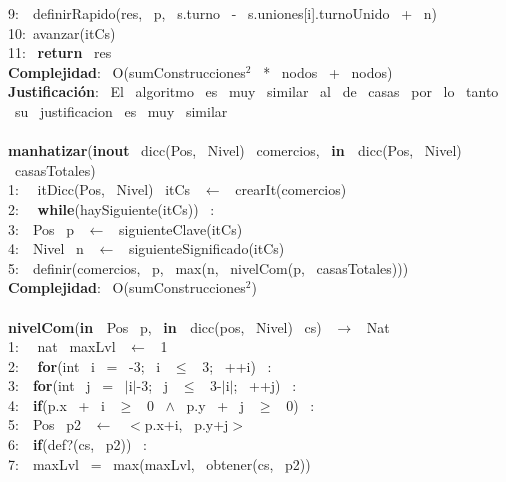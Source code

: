 \begin{Algoritmos}
    9:\indent \indent \indent  \  \ definirRapido(res, \ p, \ s.turno \ - \ s.uniones[i].turnoUnido \ + \ n)\\
    10:\indent \indent  \ avanzar(itCs)\\
    11: \ \textbf{return} \ res\\
    \textbf{Complejidad}: \ O(sumConstrucciones$^2$ \ * \ nodos \ + \ nodos)\\
    \textbf{Justificaci\'on}: \ El \ algoritmo \ es \ muy \ similar \ al \ de \ casas \ por \ lo \ tanto \ su \
    justificacion \ es \ muy \ similar\\
    \\
    \textbf{manhatizar}(\textbf{inout} \ dicc(Pos, \ Nivel) \ comercios, \ \textbf{in \ }dicc(Pos, \ Nivel) \ casasTotales) \ \\
    1: \  \ itDicc(Pos, \ Nivel) \ itCs \ $\leftarrow$ \ crearIt(comercios)\\
    2: \  \ \textbf{while}(haySiguiente(itCs)) \ :\\
    3:\indent  \  \ Pos \ p \ $\leftarrow$ \ siguienteClave(itCs)\\
    4:\indent  \  \ Nivel \ n \ $\leftarrow$ \ siguienteSignificado(itCs)\\
    5:\indent  \  \ definir(comercios, \ p, \ max(n, \ nivelCom(p, \ casasTotales)))\\
    \textbf{Complejidad}: \ O(sumConstrucciones$^2$)\\
    \makebox[\linewidth]{\rule{\textwidth}{0.4pt}}
    \\
    \makebox[\linewidth]{\rule{\textwidth}{0.4pt}}
    \textbf{nivelCom}(\textbf{in \ }Pos \ p, \ \textbf{in \ }dicc(pos, \ Nivel) \ cs) \ $\rightarrow $ \ Nat\\
    1: \  \ nat \ maxLvl \ $\leftarrow$ \ 1\\
    2: \  \ \textbf{for}(int \ i \ = \ -3; \ i \ $\leq$ \ 3; \ ++i) \ :\\
    3:\indent  \  \ \textbf{for}(int \ j \ = \ $\mid$i$\mid$-3; \ j \ $\leq$ \ 3-$\mid$i$\mid$; \ ++j) \ :\\
    4:\indent \indent  \  \ \textbf{if}(p.x \ + \ i \ $\geq$ \ 0 \ $\wedge$ \ p.y \ + \ j \ $\geq$ \ 0) \ :\\
    5:\indent \indent \indent  \  \ Pos \ p2 \ $\leftarrow$ \ $<$p.x+i, \ p.y+j$>$ \ \\
    6:\indent \indent \indent  \  \ \textbf{if}(def?(cs, \ p2)) \ :\\
    7:\indent \indent \indent \indent  \  \ maxLvl \ = \ max(maxLvl, \ obtener(cs, \ p2))\\

\end{Algoritmos}
